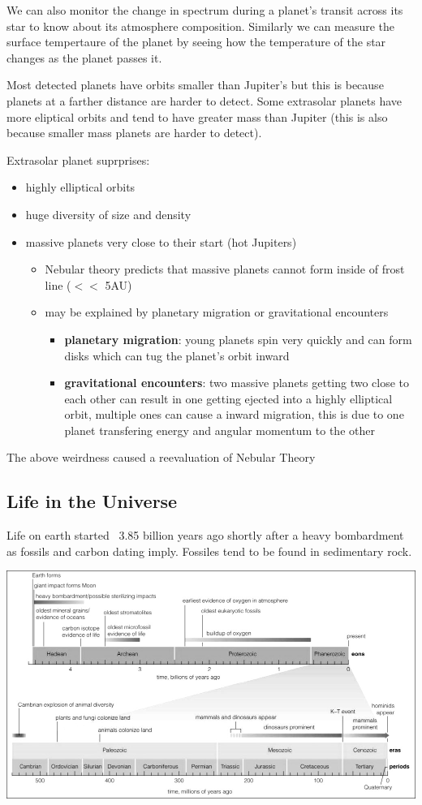 \documentclass[12pt]{article}
\begin{document}
We can also monitor the change in spectrum during a planet's transit across its star to know about its atmosphere composition. Similarly we can measure the surface tempertaure of the planet by seeing how the temperature of the star changes as the planet passes it.

Most detected planets have orbits smaller than Jupiter's but this is because planets at a farther distance are harder to detect. Some extrasolar planets have more eliptical orbits and tend to have greater mass than Jupiter (this is also because smaller mass planets are harder to detect).

Extrasolar planet suprprises:
\begin{itemize}
\item highly elliptical orbits
\item huge diversity of size and density
\item massive planets very close to their start (hot Jupiters)
\begin{itemize}
\item Nebular theory predicts that massive planets cannot form inside of frost line ($<<$ 5AU)
\item may be explained by planetary migration or gravitational encounters
\begin{itemize}
\item \textbf{planetary migration}: young planets spin very quickly and can form disks which can tug the planet's orbit inward
\item \textbf{gravitational encounters}: two massive planets getting two close to each other can result in one getting ejected into a highly elliptical orbit, multiple ones can cause a inward migration, this is due to one planet transfering energy and angular momentum to the other
\end{itemize}
\end{itemize}
\end{itemize}
The above weirdness caused a reevaluation of Nebular Theory

\subsection{Life in the Universe}
Life on earth started ~3.85 billion years ago shortly after a heavy bombardment as fossils and carbon dating imply. Fossiles tend to be found in sedimentary rock.

\includegraphics[angle=90,scale=0.7]{geologicalTimeline}
\end{document}
